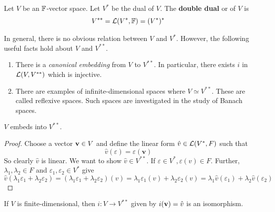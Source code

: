 \documentclass[a4paper,11pt]{article}
\begin{document}
\begin{definition}
	Let $ V $ be an $ {\mathbb{F}} $-vector space.
	Let $ V^* $ be the dual of $ V $.
	The \textbf{double dual} or  of $ V $ is
	\[
		V^{* *} = {\mathcal{L}}(V^*, {\mathbb{F}}) = (V^*)^*
	\]
\end{definition}
\begin{remark}
	In general, there is no obvious relation between $ V $ and $ V^* $.
	However, the following useful facts hold about $ V $ and $ V^{* *} $.
	\begin{enumerate}
		\item There is a \textit{canonical embedding} from $ V $ to $ V^{* *} $.
		      In particular, there exists $ i $ in $ {\mathcal{L}}(V, V^{* *}) $ which is injective.
		\item There are examples of infinite-dimensional spaces where $ V \simeq V^{* *} $.
		      These are called reflexive spaces.
		      Such spaces are investigated in the study of Banach spaces.
	\end{enumerate}
\end{remark}
\begin{theorem}
	$ V $ embeds into $ V^{* *} $.
\end{theorem}
\begin{proof}
	Choose a vector $ {\bf v} \in V $ and define the linear form $ \hat v \in {\mathcal{L}}(V^*, F) $ such that
	\[
		\hat v(\varepsilon) = \varepsilon(\mathbf{v})
	\]
	So clearly $ \hat v $ is linear.
	We want to show $ \hat v \in V^{* *} $.
	If $ \varepsilon \in V^*, \varepsilon(v) \in F $.
	Further, $ \lambda_1, \lambda_2 \in F $ and $ \varepsilon_1, \varepsilon_2 \in V^* $ give
	\[
		\hat v (\lambda_1 \varepsilon_1 + \lambda_2 \varepsilon_2) = (\lambda_1 \varepsilon_1 + \lambda_2 \varepsilon_2)(v) = \lambda_1 \varepsilon_1(v) + \lambda_2 \varepsilon_2(v) = \lambda_1 \hat v(\varepsilon_1) + \lambda_2 \hat v(\varepsilon_2)
	\]
\end{proof}
\begin{theorem}
	If $ V $ is finite-dimensional, then $ i \colon V \to V^{* *} $ given by $ i({\bf v}) = \hat v $ is an isomorphism.
\end{theorem}
\end{document}
